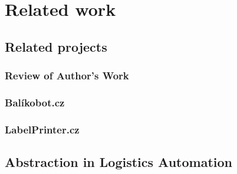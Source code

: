 \chapter{Related work}
\label{chap:related-work}
\section{Related projects}
\label{sec:related-projects}
\subsection{Review of Author's Work}
\label{subsec:review-of-authors-work}
\subsection{Balíkobot.cz}
\label{subsec:balikobot}
\subsection{LabelPrinter.cz}
\label{subsec:labelprinter}
\section{Abstraction in Logistics Automation}
\label{sec:abstraction-in-logistics-automation}
